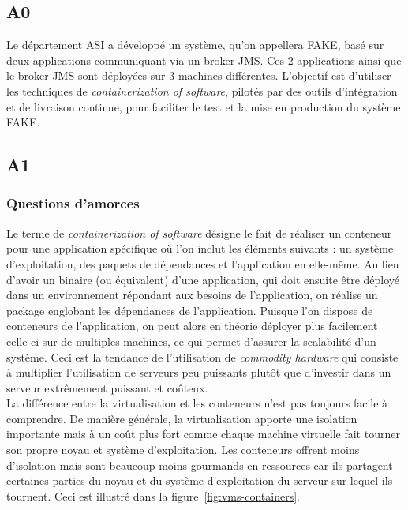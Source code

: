 \subsection{A0}
Le département ASI a développé un système, qu'on appellera FAKE, basé sur deux applications communiquant via un broker JMS. Ces 2 applications ainsi que le broker JMS sont déployées sur 3 machines différentes. L'objectif est d'utiliser les techniques de \textit{containerization of software}, pilotés par des outils d'intégration et de livraison continue, pour faciliter le test et la mise en production du système FAKE.

\subsection{A1}
    \subsubsection{Questions d'amorces}
    Le terme de \textit{containerization of software} désigne le fait de réaliser un conteneur pour une application spécifique où l'on inclut les éléments suivants : un système d'exploitation, des paquets de dépendances et l'application en elle-même\cite{webopedia}. Au lieu d'avoir un binaire (ou équivalent) d'une application, qui doit ensuite être déployé dans un environnement répondant aux besoins de l'application, on réalise un package englobant les dépendances de l'application. Puisque l'on dispose de conteneurs de l'application, on peut alors en théorie déployer plus facilement celle-ci sur de multiples machines, ce qui permet d'assurer la scalabilité d'un système. Ceci est la tendance de l'utilisation de \textit{commodity hardware} qui consiste à multiplier l'utilisation de serveurs peu puissants plutôt que d'investir dans un serveur extrêmement puissant et coûteux.\\

    La différence entre la virtualisation et les conteneurs n'est pas toujours facile à comprendre. De manière générale, la virtualisation apporte une isolation importante mais à un coût plus fort comme chaque machine virtuelle fait tourner son propre noyau et système d'exploitation. Les conteneurs offrent moins d'isolation mais sont beaucoup moins gourmands en ressources car ils partagent certaines parties du noyau et du système d'exploitation du serveur sur lequel ils tournent. Ceci est illustré dans la figure~\ref{fig:vms-containers}.\\

